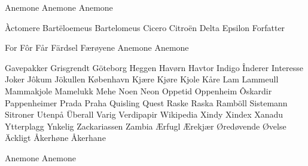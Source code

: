 \documentclass[norsk]{scrartcl}
\begin{document}
Anemone
Anemone
Anemone

Àctomere
Bartëloemeus
Bartelomeus
Cicero
Citroën
Delta
Epsilon
Forfatter


For
Fôr
Får
Färdsel
Færøyene
Anemone
Anemone

Gavepakker
Grisgrendt
Göteborg
Heggen
Havørn
Havtor
Indigo
Înderer
Interesse
Joker
Jôkum
Jökullen
København
Kjære
Kjøre
Kjole
Kåre
Lam
Lammeull
Mammakjole
Mamelukk
Mehe
Noen
Neon
Oppetid
Oppenheim
Ôskardir
Pappenheimer
Prada
Praha
Quisling
Quest
Raske
Raska
Ramböll
Sistemann
Sitroner
Utenpå
Überall
Varig
Verdipapir
Wikipedia
Xindy
Xindex
Xanadu
Ytterplagg
Ynkelig
Zackariassen
Zambia
Ærfugl
Ærekjær
Øredøvende
Øvelse
Äckligt
Åkerhøne
Åkerhane

\newpage
Anemone
Anemone
\end{document}
